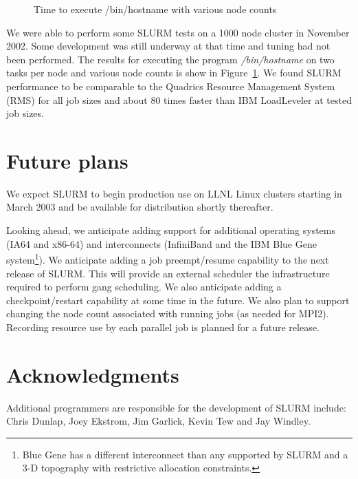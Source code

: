 \documentclass{article}
\begin{document}
\begin{figure}[htb]
\centerline{}
\caption{Time to execute /bin/hostname with various node counts}
\label{timing}
\end{figure}

We were able to perform some SLURM tests on a 1000 node cluster in 
November 2002. Some development was still underway at that time and 
tuning had not been performed. The results for executing the program 
{\em /bin/hostname} on two tasks per node and various node counts is show 
in Figure~\ref{timing}. We found SLURM performance to be comparable 
to the Quadrics Resource Management System (RMS)\cite{Quadrics2002} 
for all job sizes and about 80 times faster than IBM 
LoadLeveler\cite{LL2002} at tested job sizes.

\section{Future plans}

We expect SLURM to begin production use on LLNL Linux clusters 
starting in March 2003 and be available for distribution shortly 
thereafter. 

Looking ahead, we anticipate adding support for additional 
operating systems (IA64 and x86-64) and interconnects (InfiniBand
and the IBM Blue Gene\cite{BlueGene2002} system\footnote{Blue Gene 
has a different interconnect than any supported by SLURM and 
a 3-D topography with restrictive allocation constraints.}). 
We anticipate adding a job preempt/resume capability to 
the next release of SLURM. 
This will provide an external scheduler the infrastructure 
required to perform gang scheduling. 
We also anticipate adding a checkpoint/restart capability 
at some time in the future. 
We also plan to support changing the node count associated 
with running jobs (as needed for MPI2). 
Recording resource use by each parallel job is planned for a 
future release.

\section{Acknowledgments}

Additional programmers are responsible for the development of 
SLURM include: Chris Dunlap, Joey Ekstrom, Jim Garlick, Kevin Tew
and Jay Windley.



\end{document}
